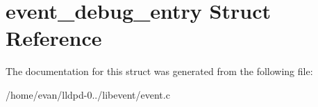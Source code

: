 \section{event\-\_\-debug\-\_\-entry \-Struct \-Reference}
\label{structevent__debug__entry}


\-The documentation for this struct was generated from the following file\-:\begin{DoxyCompactItemize}
\item 
/home/evan/lldpd-\/0../libevent/event.\-c\end{DoxyCompactItemize}
